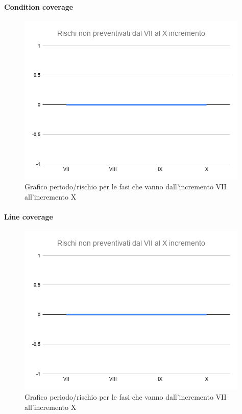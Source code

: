 \paragraph{Condition coverage}
\begin{figure}[H]
			\centering%
			\includegraphics[width=0.8\linewidth]{./res/images/RischiNonPreven_4.png}
			\caption{Grafico periodo/rischio per le fasi che vanno dall'incremento VII all'incremento X}
			\label{fig:Grafico periodo/rischio per le fasi che vanno dall'incremento VII all'incremento X}
	\end{figure}
\paragraph{Line coverage}
\begin{figure}[H]
			\centering%
			\includegraphics[width=0.8\linewidth]{./res/images/RischiNonPreven_4.png}
			\caption{Grafico periodo/rischio per le fasi che vanno dall'incremento VII all'incremento X}
			\label{fig:Grafico periodo/rischio per le fasi che vanno dall'incremento VII all'incremento X}
	\end{figure}
